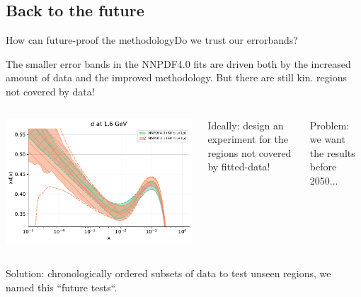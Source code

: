 \newcommand{\hlme}[1]{{\color{red}\bf #1}}

\author[Juan Cruz-Martinez]{}

\subsection{Back to the future}

\begin{frame}{How can future-proof the methodology}{Do we trust our errorbands?}

    \small
    The smaller error bands in the NNPDF4.0 fits are driven both by the increased amount of data and the
    improved methodology.
    But there are still kin. regions not covered by data!

    \begin{columns}
        \includegraphics[width=1.0\textwidth]{juan_future_hyperopt/dquark.pdf}

         \vspace{-2.3cm} {

            Ideally: design an experiment for the regions not covered by fitted-data!

            \vspace{0.3cm}

            Problem: we want the results before 2050...

        }
    \end{columns}

    \vspace{-0.3cm}

    \begin{columns}
        Solution: chronologically ordered subsets of data to test unseen regions, we named this ``future tests``.


\end{columns}
\end{frame}
